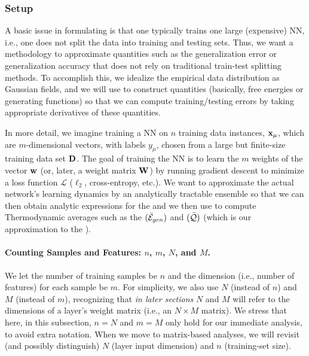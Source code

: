 \subsubsection{Setup}
\label{sxn:mathP_setup}



A basic issue in formulating \SETOL is that one typically trains one large (expensive) NN, i.e., one does not split the data into training and testing sets.
Thus, we want a methodology to approximate quantities such as the generalization error or generalization accuracy that does not rely on traditional train-test splitting methods.
To accomplish this, we idealize the empirical data distribution as Gaussian fields, and we will use \STATMECH to construct quantities (basically, free energies or generating functions) so that we can compute training/testing errors by taking appropriate derivatives of these quantities.

In more detail, we imagine training a NN on $n$ training data instances, ${\mathbf{x}}_{\mu}$, which are $m$-dimensional vectors,
with labels $y_{\mu}$, chosen from a large but finite-size training data set $\mathbf{D}$.
The goal of training the NN is to learn the $m$ weights of the vector ${\mathbf{w}}$ (or, later, a weight matrix ${\mathbf{W}}$) by running gradient descent to minimize
a loss function $\mathcal{L}$ ($\ell_2$, cross-entropy, etc.). 
We want to approximate the actual network’s learning dynamics by an analytically tractable ensemble
so that we can then obtain 
analytic expressions for the \emph{\FreeEnergy} and \emph{\GeneratingFunction} we then use to compute
Thermodynamic averages such as the \emph{\AverageGeneralizationError} $(\bar{\mathcal{E}}_{gen})$ and
\emph{\ModelQuality} $(\bar{\mathcal{Q}})$ (which is our approximation to the \emph{\AverageGeneralizationAccuracy}).



\paragraph{Counting Samples and Features: $n$, $m$, $N$, and $M$.}
We let the number of training samples be $n$ and the dimension 
(i.e., number of features) for each sample be $m$.  For simplicity, 
we also use $N$ (instead of $n$) and $M$ (instead of $m$), recognizing that 
\emph{in later sections} $N$ and $M$ will refer to the dimensions 
of a layer’s weight matrix (i.e., an $N \times M$ matrix). 
We stress that here, in this subsection,  $n = N$ and $m = M$ only hold for our immediate analysis, 
to avoid extra notation. When we move to matrix-based analyses, 
we will revisit (and possibly distinguish) $N$ (layer input dimension) and $n$ (training-set size).


